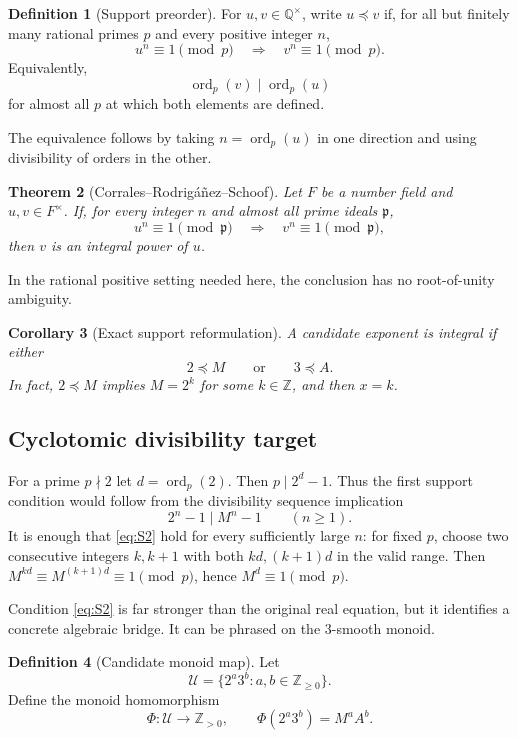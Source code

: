 \documentclass[11pt]{article}
\newtheorem{theorem}{Theorem}[section]
\newtheorem{corollary}[theorem]{Corollary}
\theoremstyle{definition}
\newtheorem{definition}[theorem]{Definition}
\theoremstyle{remark}
\newcommand{\Q}{\mathbb{Q}}
\newcommand{\Z}{\mathbb{Z}}
\newcommand{\ord}{\operatorname{ord}}
\begin{document}
\begin{definition}[Support preorder]
For $u,v\in\Q^\times$, write $u\preccurlyeq v$ if, for all but finitely many rational primes
$p$ and every positive integer $n$,
\[
       u^n\equiv1\pmod p\quad\Longrightarrow\quad v^n\equiv1\pmod p.
\]
Equivalently,
\[
       \ord_p(v)\mid \ord_p(u)
\]
for almost all $p$ at which both elements are defined.
\end{definition}
The equivalence follows by taking $n=\ord_p(u)$ in one direction and using divisibility of
orders in the other.

\begin{theorem}[Corrales--Rodrig\'a\~nez--Schoof]\label{thm:CRS}
Let $F$ be a number field and $u,v\in F^\times$.  If, for every integer $n$ and almost all
prime ideals $\mathfrak p$,
\[
   u^n\equiv1\pmod{\mathfrak p}
       \quad\Longrightarrow\quad
   v^n\equiv1\pmod{\mathfrak p},
\]
then $v$ is an integral power of $u$.
\end{theorem}

In the rational positive setting needed here, the conclusion has no root-of-unity ambiguity.

\begin{corollary}[Exact support reformulation]\label{cor:supportAE}
A candidate exponent is integral if either
\[
       2\preccurlyeq M
       \qquad\text{or}\qquad
       3\preccurlyeq A.
\]
In fact, $2\preccurlyeq M$ implies $M=2^k$ for some $k\in\Z$, and then $x=k$.
\end{corollary}

\subsection{Cyclotomic divisibility target}

For a prime $p\nmid2$ let $d=\ord_p(2)$.  Then $p\mid2^d-1$.  Thus the first support
condition would follow from the divisibility sequence implication
\[
       2^n-1\mid M^n-1\qquad(n\ge1).
       \tag{S2}\label{eq:S2}
\]
It is enough that \eqref{eq:S2} hold for every sufficiently large $n$: for fixed $p$, choose two
consecutive integers $k,k+1$ with both $kd,(k+1)d$ in the valid range.  Then
$M^{kd}\equiv M^{(k+1)d}\equiv1\pmod p$, hence $M^d\equiv1\pmod p$.

Condition \eqref{eq:S2} is far stronger than the original real equation, but it identifies a
concrete algebraic bridge.  It can be phrased on the $3$-smooth monoid.

\begin{definition}[Candidate monoid map]\label{def:phi}
Let
\[
       \mathcal U=\{2^a3^b:a,b\in\Z_{\ge0}\}.
\]
Define the monoid homomorphism
\[
       \Phi:\mathcal U\longrightarrow\Z_{>0},
       \qquad
       \Phi(2^a3^b)=M^aA^b.
\]
\end{definition}
\end{document}
